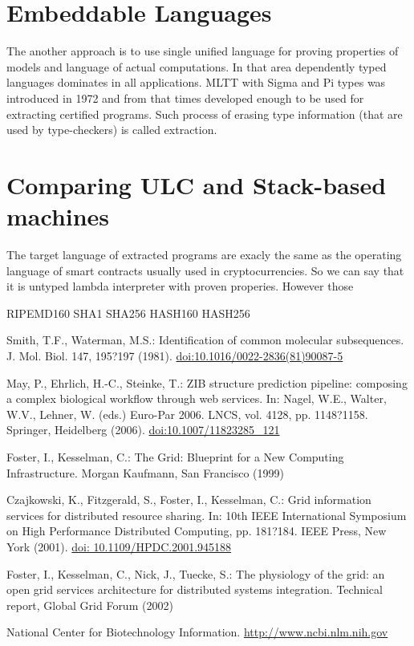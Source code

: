 \documentclass{svproc}
\begin{document}
\section{Embeddable Languages}
The another approach is to use single unified language for proving properties of models
and language of actual computations. In that area dependently typed languages dominates
in all applications. MLTT with Sigma and Pi types was introduced in 1972 and from that
times developed enough to be used for extracting certified programs. Such process of
erasing type information (that are used by type-checkers) is called extraction.

\section{Comparing ULC and Stack-based machines}
The target language of extracted programs are exacly the same as the operating language
of smart contracts usually used in cryptocurrencies. So we can say that
it is untyped lambda interpreter with proven properies. However those


RIPEMD160
SHA1
SHA256
HASH160
HASH256


%
\begin{thebibliography}{6}
%

Smith, T.F., Waterman, M.S.: Identification of common molecular subsequences.
J. Mol. Biol. 147, 195?197 (1981). \url{doi:10.1016/0022-2836(81)90087-5}

May, P., Ehrlich, H.-C., Steinke, T.: ZIB structure prediction pipeline:
composing a complex biological workflow through web services.
In: Nagel, W.E., Walter, W.V., Lehner, W. (eds.) Euro-Par 2006.
LNCS, vol. 4128, pp. 1148?1158. Springer, Heidelberg (2006).
\url{doi:10.1007/11823285_121}

Foster, I., Kesselman, C.: The Grid: Blueprint for a New Computing Infrastructure.
Morgan Kaufmann, San Francisco (1999)

Czajkowski, K., Fitzgerald, S., Foster, I., Kesselman, C.: Grid information services
for distributed resource sharing. In: 10th IEEE International Symposium
on High Performance Distributed Computing, pp. 181?184. IEEE Press, New York (2001).
\url{doi: 10.1109/HPDC.2001.945188}

Foster, I., Kesselman, C., Nick, J., Tuecke, S.: The physiology of the grid: an open grid services architecture for distributed systems integration. Technical report, Global Grid
Forum (2002)

National Center for Biotechnology Information. \url{http://www.ncbi.nlm.nih.gov}


\end{thebibliography}
\end{document}
